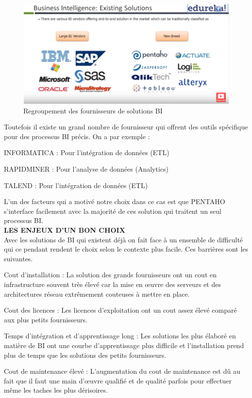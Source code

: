 \begin{figure}[!htbp]
	\begin{center}
		\includegraphics[scale=0.75]{images/compare_bi_vendors.png}
		\caption{Regroupement des fournisseurs de solutions BI}
		\label{use_bi_tools}
	\end{center}
\end{figure}

Toutefois il existe un grand nombre de fournisseur qui offrent des outils spécifique pour des processus BI précis. On a par exemple : 
\begin{list}{•}{ }
   \item INFORMATICA : Pour l’intégration de données (ETL)
   \item RAPIDMINER : Pour l’analyse de données (Analytics)
   \item TALEND : Pour l’intégration de données (ETL)\\
\end{list}

L’un des facteurs qui a motivé notre choix dans ce cas est que PENTAHO s’interface facilement avec la majorité de ces solution qui traitent un seul processus BI.\\

\textbf{LES ENJEUX D’UN BON CHOIX}\\

	Avec les solutions de BI qui existent déjà on fait face à un ensemble de difficulté qui ce pendant rendent le choix selon le contexte plus facile. Ces barrières sont les suivantes.
	\begin{list}{•}{ }
	   \item Cout d’installation : La solution des grands fournisseurs ont un cout en infrastructure souvent très élevé car la mise en œuvre des serveurs et des architectures réseau extrêmement couteuses à  mettre en place.
	   \item Cout des licences : Les licences d’exploitation ont un cout assez élevé comparé aux plus petits fournisseurs.
	   \item Temps d’intégration et d’apprentissage long : Les solutions les plus élaboré en matière de BI ont une courbe d’apprentissage plus difficile et l’installation prend plus de temps que les solutions des petits fournisseurs.
	   \item Cout de maintenance élevé : L’augmentation du cout de maintenance est dû au fait que il faut une main d’œuvre qualifié et de qualité parfois pour effectuer même les taches les plus dérisoires.\\
	\end{list}
	
